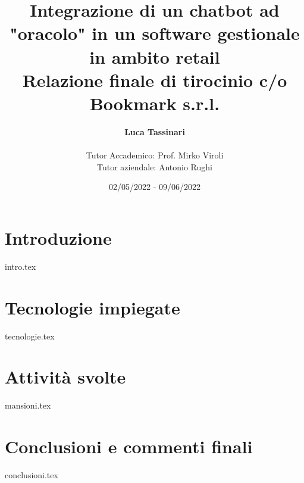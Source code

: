 \documentclass[a4paper,11pt]{report}
\title{
	Integrazione di un chatbot ad "oracolo" in un software gestionale in ambito  retail \\
	\large Relazione finale di tirocinio c/o Bookmark s.r.l.
}
\author{
	\textbf{Luca Tassinari} \\\\
	Tutor Accademico: Prof. Mirko Viroli \\
	Tutor aziendale: Antonio Rughi
}
\date{02/05/2022 - 09/06/2022}
\begin{document}
\maketitle

\tableofcontents

\chapter[Introduzione]{Introduzione}
{intro.tex}

\chapter[Tecnologie]{Tecnologie impiegate}
{tecnologie.tex}

\chapter[Attività]{Attività svolte}
{mansioni.tex}

\chapter[Conclusioni]{Conclusioni e commenti finali}
{conclusioni.tex}



\end{document}
